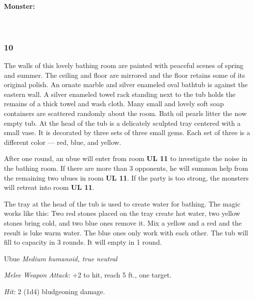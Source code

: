 \documentclass[palace_of_the_silver_princess]{subfiles}
\begin{document}
\textbf{Monster:}
\\
\\
\\

\subsubsection{10}
\begin{quotebox}
    The walls of this lovely bathing room are painted with peaceful
    scenes of spring and summer. The ceiling and floor are mirrored and
    the floor retains some of its original polish. An ornate marble and
    silver enameled oval bathtub is against the eastern wall. A silver
    enameled towel rack standing next to the tub holds the remains of a
    thick towel and wash cloth. Many small and lovely soft soap
    containers are scattered randomly about the room. Bath oil pearls
    litter the now empty tub. At the head of the tub is a delicately
    sculpted tray centered with a small vase. It is decorated by three
    sets of three small gems. Each set of three is a different color —
    red, blue, and yellow.
\end{quotebox}

After one round, an ubue will enter from room \textbf{UL 11} to
investigate the noise in the bathing room. If there are more than 3
opponents, he will summon help from the remaining two ubues in room
\textbf{UL 11}. If the party is too strong, the monsters will retreat
into room \textbf{UL 11}.

The tray at the head of the tub is used to create water for bathing. The
magic works like this: Two red stones placed on the tray create hot
water, two yellow stones bring cold, and two blue ones remove it. Mix a
yellow and a red and the result is luke warm water. The blue ones only
work with each other. The tub will fill to capacity in 3 rounds. It will
empty in 1 round.

\begin{monsterbox}{Ubue}
	\textit{Medium humanoid, true neutral}\\
	\hline
	\basics[
		armorclass = {10},
		hitpoints = {4 (1d8)},
		speed = {30~ft.}]
	\hline
	\stats[
		STR = \stat{10},
		DEX = \stat{10},
		CON = \stat{10},
		INT = \stat{10},
		WIS = \stat{10},
		CHA = \stat{10}]
	\hline
	\details[
		senses = {passive Perception 10},
		languages = {Common},
		challenge = {0 (10 XP)}]
	\hline
    \begin{monsteraction}[Club]
		\textit{Melee Weapon Attack:} +2 to hit, reach 5 ft., one
        target.

        \textit{Hit:} 2 (1d4) bludgeoning damage.
	\end{monsteraction}
\end{monsterbox}
\end{document}
